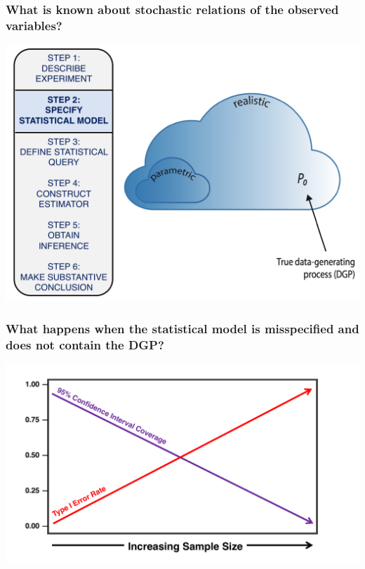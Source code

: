 \documentclass[t]{beamer}
\begin{document}
\begin{frame}
  \frametitle{What is known about stochastic relations of the observed variables?}
  \vspace{-20pt}
  \begin{center}
  \includegraphics[width = 1.05\textwidth]{figures/roadmap2.pdf}
  \end{center}
\end{frame}

\begin{frame}
\frametitle{What happens when the statistical model is misspecified and does not contain the DGP?}
\vspace{15pt}
\centering
\includegraphics[width=1.05\textwidth]{figures/misspecified.pdf}
\end{frame}
\end{document}
